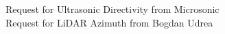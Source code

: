 
\begin{center}
\newline Request for Ultrasonic Directivity from Microsonic\\
\vspace{1\baselineskip} %
\newline Request for LiDAR Azimuth from Bogdan Udrea\\


\end{center}
